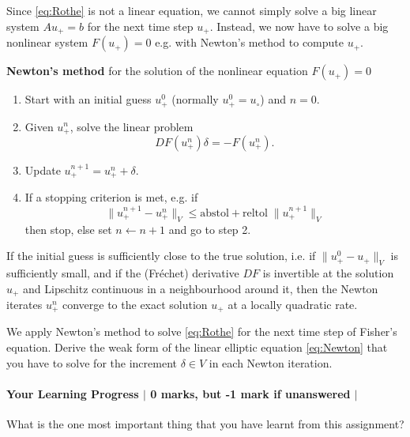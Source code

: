 \documentclass[10pt,letterpaper]{scrartcl}
\begin{document}
\newpage

Since \eqref{eq:Rothe} is not a linear equation, we cannot simply solve a big linear system $Au_+ = b$ for the next time step $u_+$. Instead, we now have to solve a big nonlinear system $F(u_+) = 0$ e.g. with Newton's method to compute $u_+$.
\begin{shaded}
\textsf{\bfseries Newton's method} for the solution of the nonlinear equation $F(u_+) = 0$
\begin{enumerate}
\item Start with an initial guess $u_+^0$ (normally $u_+^0=u_\circ$) and $n=0$.
\item Given $u_+^n$, solve the linear problem
\begin{equation}\label{eq:Newton}
DF(u_+^n) \delta = -F(u_+^n).
\end{equation}
\item Update $u_+^{n+1} = u_+^n + \delta$.
\item If a stopping criterion is met, e.g. if
\begin{equation*}
\lVert u_+^{n+1} - u_+^n \rVert_V \leq \text{abstol} + \text{reltol} \; \lVert u_+^{n+1} \rVert_V
\end{equation*}
then stop, else set $n \leftarrow n+1$ and go to step 2.
\end{enumerate}
If the initial guess is sufficiently close to the true solution, i.e. if $\lVert u_+^0 - u_+\rVert_V$ is sufficiently small, and if the (Fréchet) derivative $DF$ is invertible at the solution $u_+$ and Lipschitz continuous in a neighbourhood around it, then the Newton iterates $u_+^n$ converge to the exact solution $u_+$ at a locally quadratic rate.
\end{shaded}

We apply Newton's method to solve \eqref{eq:Rothe} for the next time step of Fisher's equation. Derive the weak form of the linear elliptic equation \eqref{eq:Newton} that you have to solve for the increment $\delta \in V$ in each Newton iteration.

\newpage

\mbox{}

\vfill

\paragraph*{Your Learning Progress $\vert$ 0 marks, but -1 mark if unanswered $\vert$ \faFilePdfO}
What is the one most important thing that you have learnt from this assignment?
\end{document}
